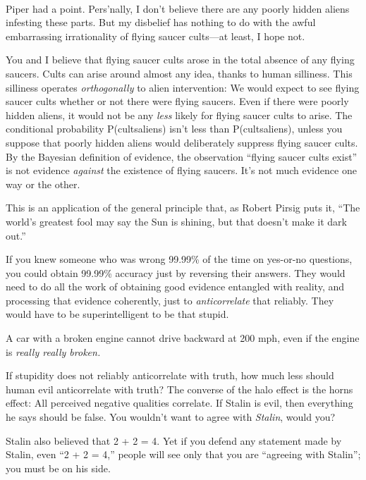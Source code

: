 {
 ~}

{
 Piper had a point. Pers'nally, I
don't believe there are any poorly hidden aliens
infesting these parts. But my disbelief has nothing to do with the
awful embarrassing irrationality of flying saucer cults---at least, I
hope not.}

{
 You and I believe that flying saucer cults arose in the total
absence of any flying saucers. Cults can arise around almost any idea,
thanks to human silliness. This silliness operates
\textit{orthogonally} to alien intervention: We would expect to see
flying saucer cults whether or not there were flying saucers. Even if
there were poorly hidden aliens, it would not be any \textit{less}
likely for flying saucer cults to arise. The conditional probability
P(cults{\textbar}aliens) isn't less than
P(cults{\textbar}{\textlnot}aliens), unless you suppose that poorly
hidden aliens would deliberately suppress flying saucer cults. By the
Bayesian definition of evidence, the observation
``flying saucer cults exist'' is not
evidence \textit{against} the existence of flying saucers.
It's not much evidence one way or the other.}

{
 This is an application of the general principle that, as Robert
Pirsig puts it, ``The world's greatest
fool may say the Sun is shining, but that doesn't make
it dark out.''}

{
 If you knew someone who was wrong 99.99\% of the time on yes-or-no
questions, you could obtain 99.99\% accuracy just by reversing their
answers. They would need to do all the work of obtaining good evidence
entangled with reality, and processing that evidence coherently, just
to \textit{anticorrelate} that reliably. They would have to be
superintelligent to be that stupid.}

{
 A car with a broken engine cannot drive backward at 200 mph, even
if the engine is \textit{really really broken.}}

{
 If stupidity does not reliably anticorrelate with truth, how much
less should human evil anticorrelate with truth? The converse of the
halo effect is the horns effect: All perceived negative qualities
correlate. If Stalin is evil, then everything he says should be false.
You wouldn't want to agree with \textit{Stalin}, would
you?}

{
 Stalin also believed that 2 + 2 = 4. Yet if you defend any
statement made by Stalin, even ``2 + 2 =
4,'' people will see only that you are
``agreeing with Stalin''; you must
be on his side.}

